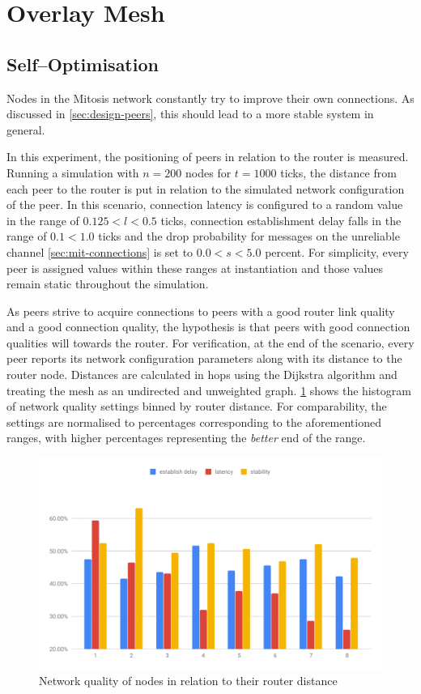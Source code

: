 \section{Overlay Mesh}

\subsection{Self–Optimisation}
Nodes in the Mitosis network constantly try to improve their own connections. As discussed in \vref{sec:design-peers}, this should lead to a more stable system in general.

In this experiment, the positioning of peers in relation to the router is measured. Running a simulation with $n=200$ nodes for $t=1000$ ticks, the distance from each peer to the router is put in relation to the simulated network configuration of the peer. In this scenario, connection latency is configured to a random value in the range of $0.125<l<0.5$ ticks, connection establishment delay falls in the range of $0.1<1.0$ ticks and the drop probability for messages on the unreliable channel \cref{sec:mit-connections} is set to $0.0<s<5.0$ percent. For simplicity, every peer is assigned values within these ranges at instantiation and those values remain static throughout the simulation.

As peers strive to acquire connections to peers with a good router link quality and a good connection quality, the hypothesis is that peers with good connection qualities will  towards the router. For verification, at the end of the scenario, every peer reports its network configuration parameters along with its distance to the router node. Distances are calculated in hops using the Dijkstra algorithm and treating the mesh as an undirected and unweighted graph.
\cref{fig:connection-quality-per-distance} shows the histogram of network quality settings binned by router distance. For comparability, the settings are normalised to percentages corresponding to the aforementioned ranges, with higher percentages representing the \textit{better} end of the range.

\begin{figure}[htb!]
\centering
\includegraphics[width=1.0\textwidth]{graphics/analysis/connection-quality-per-distance.pdf}
\caption{Network quality of nodes in relation to their router distance}
\label{fig:connection-quality-per-distance}
\end{figure}

